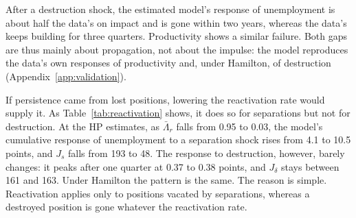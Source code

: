 \documentclass[authoryear, review, 12pt]{elsarticle}
\begin{document}
After a destruction shock, the estimated model's response of unemployment is about half the data's on impact and is gone within two years, whereas the data's keeps building for three quarters. Productivity shows a similar failure. Both gaps are thus mainly about propagation, not about the impulse: the model reproduces the data's own responses of productivity and, under Hamilton, of destruction (Appendix~\ref{app:validation}).

If persistence came from lost positions, lowering the reactivation rate would supply it. As Table~\ref{tab:reactivation} shows, it does so for separations but not for destruction. At the HP estimates, as $\bar\Lambda_r$ falls from 0.95 to 0.03, the model's cumulative response of unemployment to a separation shock rises from 4.1 to 10.5 points, and $J_s$ falls from 193 to 48. The response to destruction, however, barely changes: it peaks after one quarter at 0.37 to 0.38 points, and $J_\delta$ stays between 161 and 163. Under Hamilton the pattern is the same. The reason is simple. Reactivation applies only to positions vacated by separations, whereas a destroyed position is gone whatever the reactivation rate.
\end{document}
